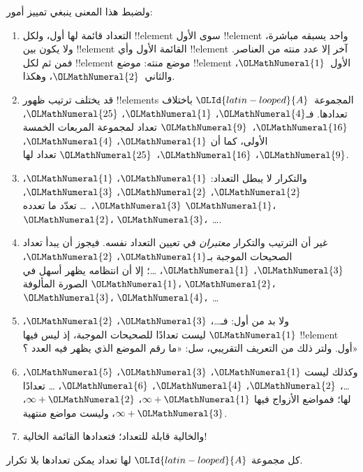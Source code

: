 \documentclass[../../../include/open-logic-section]{subfiles}
\begin{document}
\begin{explain}
ولضبط هذا المعنى ينبغي تمييز أمور:
\begin{enumerate}
\item التعداد قائمة لها أول، ولكل !!{element} سوى الأول
!!{element} واحد يسبقه مباشرة، ولا يكون بين !!{element} القائمة
الأول وأي !!{element} آخر إلا عدد منته من العناصر. فمن ثم لكل
!!{element} موضع منته: موضع !!{element} الأول~$\OLMathNumeral{1}$، والثاني~$\OLMathNumeral{2}$، وهكذا.
\item قد يختلف ترتيب ظهور !!{element}s المجموعة~$\OLId{latin-looped}{A}$ باختلاف تعدادها.
فـ$\OLMathNumeral{4}$، $\OLMathNumeral{1}$، $\OLMathNumeral{25}$، $\OLMathNumeral{16}$،~$\OLMathNumeral{9}$ تعداد لمجموعة المربعات الخمسة الأولى،
كما أن $\OLMathNumeral{1}$، $\OLMathNumeral{4}$، $\OLMathNumeral{9}$، $\OLMathNumeral{16}$،~$\OLMathNumeral{25}$ تعداد لها.
\item والتكرار لا يبطل التعداد: $\OLMathNumeral{1}$، $\OLMathNumeral{1}$، $\OLMathNumeral{2}$، $\OLMathNumeral{2}$، $\OLMathNumeral{3}$، $\OLMathNumeral{3}$،~\dots{}
تعدّد ما تعدده $\OLMathNumeral{1}$، $\OLMathNumeral{2}$، $\OLMathNumeral{3}$،~\dots{}.
\item غير أن الترتيب والتكرار \emph{معتبران} في تعيين التعداد نفسه.
فيجوز أن يبدأ تعداد الصحيحات الموجبة بـ$\OLMathNumeral{1}$، $\OLMathNumeral{2}$، $\OLMathNumeral{3}$، $\OLMathNumeral{1}$، \dots{}؛
إلا أن انتظامه يظهر أسهل في الصورة المألوفة $\OLMathNumeral{1}$، $\OLMathNumeral{2}$، $\OLMathNumeral{3}$، $\OLMathNumeral{4}$،~\dots
\item ولا بد من أول: فـ\dots، $\OLMathNumeral{3}$، $\OLMathNumeral{2}$، $\OLMathNumeral{1}$ ليست تعدادًا للصحيحات
الموجبة، إذ ليس فيها !!{element} أول. ولتر ذلك من التعريف التقريبي،
سل: «ما رقم الموضع الذي يظهر فيه العدد ؟»
\item وكذلك ليست $\OLMathNumeral{1}$، $\OLMathNumeral{3}$، $\OLMathNumeral{5}$، \dots، $\OLMathNumeral{2}$، $\OLMathNumeral{4}$، $\OLMathNumeral{6}$، \dots\@
تعدادًا لها؛ فمواضع الأزواج فيها $\infty + \OLMathNumeral{1}$، $\infty + \OLMathNumeral{2}$، $\infty +
\OLMathNumeral{3}$، وليست مواضع منتهية.
\item والخالية قابلة للتعداد؛ فتعدادها القائمة الخالية!{}
\end{enumerate}
\end{explain}

\begin{prop}
كل مجموعة $\OLId{latin-looped}{A}$ لها تعداد يمكن تعدادها بلا تكرار.
\end{prop}
\end{document}
